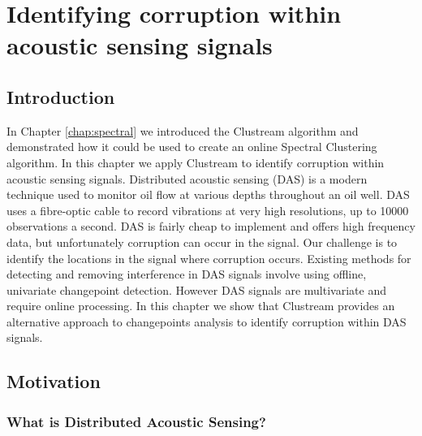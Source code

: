 %							

%								
\graphicspath{{Chapter3/figures/}} 

\chapter{Identifying corruption within acoustic sensing signals}
\label{chap:das}

\section{Introduction}
\label{sec:das_intro}

In Chapter \ref{chap:spectral} we introduced the Clustream \citep{Aggarwal2003} algorithm and demonstrated how it could be used to create an online Spectral Clustering algorithm. In this chapter we apply Clustream to identify corruption within acoustic sensing signals.  Distributed acoustic sensing (DAS) is a modern technique used to monitor oil flow at various depths throughout an oil  well. DAS uses a fibre-optic cable to record vibrations at very high resolutions, up to 10000 observations a second.  DAS is fairly cheap to implement and offers high frequency data, but unfortunately corruption can occur in the signal.  Our challenge is to identify the locations in the signal where corruption occurs. Existing methods for detecting and removing interference in DAS signals involve using offline, univariate changepoint detection. However DAS signals are multivariate and require online processing. In this chapter we show that Clustream  provides an alternative approach to  changepoints analysis to identify corruption within DAS signals.

\section{Motivation}
\label{sec:das_motivation}

\subsection{What is Distributed Acoustic Sensing?}

